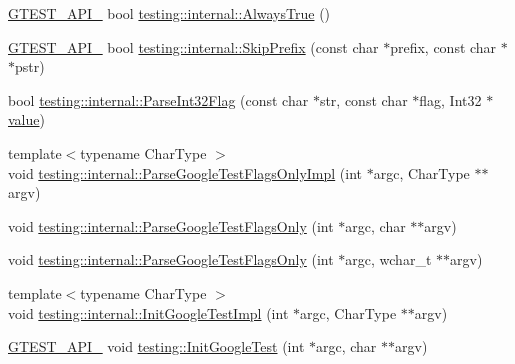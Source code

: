 \begin{DoxyCompactItemize}
\item 
\mbox{\hyperlink{_obj__test_2lib_2googletest-release-1_88_81_2googletest_2include_2gtest_2internal_2gtest-port_8h_aa73be6f0ba4a7456180a94904ce17790}{G\+T\+E\+S\+T\+\_\+\+A\+P\+I\+\_\+}} bool \mbox{\hyperlink{namespacetesting_1_1internal_a922c9da63cd4bf94fc473b9ecac76414}{testing\+::internal\+::\+Always\+True}} ()
\item 
\mbox{\hyperlink{_obj__test_2lib_2googletest-release-1_88_81_2googletest_2include_2gtest_2internal_2gtest-port_8h_aa73be6f0ba4a7456180a94904ce17790}{G\+T\+E\+S\+T\+\_\+\+A\+P\+I\+\_\+}} bool \mbox{\hyperlink{namespacetesting_1_1internal_a244d9a3765727306b597b8992ab84036}{testing\+::internal\+::\+Skip\+Prefix}} (const char $\ast$prefix, const char $\ast$$\ast$pstr)
\item 
bool \mbox{\hyperlink{namespacetesting_1_1internal_ae3449e173767750b613114ceac6d916a}{testing\+::internal\+::\+Parse\+Int32\+Flag}} (const char $\ast$str, const char $\ast$flag, Int32 $\ast$\mbox{\hyperlink{_obj__test_2lib_2googletest-master_2googlemock_2test_2gmock-matchers__test_8cc_a337b8a670efc0b086ad3af163f3121b6}{value}})
\item 
{\footnotesize template$<$typename Char\+Type $>$ }\\void \mbox{\hyperlink{namespacetesting_1_1internal_ae4c46ce8c3d016848fff52cc5133f2ac}{testing\+::internal\+::\+Parse\+Google\+Test\+Flags\+Only\+Impl}} (int $\ast$argc, Char\+Type $\ast$$\ast$argv)
\item 
void \mbox{\hyperlink{namespacetesting_1_1internal_a472880afbcc592a41e3d623e2dec8412}{testing\+::internal\+::\+Parse\+Google\+Test\+Flags\+Only}} (int $\ast$argc, char $\ast$$\ast$argv)
\item 
void \mbox{\hyperlink{namespacetesting_1_1internal_aa3c81a67914856448d0778990d9d9cab}{testing\+::internal\+::\+Parse\+Google\+Test\+Flags\+Only}} (int $\ast$argc, wchar\+\_\+t $\ast$$\ast$argv)
\item 
{\footnotesize template$<$typename Char\+Type $>$ }\\void \mbox{\hyperlink{namespacetesting_1_1internal_ac3c6fa93391768aa91c6238b31aaeeb5}{testing\+::internal\+::\+Init\+Google\+Test\+Impl}} (int $\ast$argc, Char\+Type $\ast$$\ast$argv)
\item 
\mbox{\hyperlink{_obj__test_2lib_2googletest-release-1_88_81_2googletest_2include_2gtest_2internal_2gtest-port_8h_aa73be6f0ba4a7456180a94904ce17790}{G\+T\+E\+S\+T\+\_\+\+A\+P\+I\+\_\+}} void \mbox{\hyperlink{namespacetesting_afd726ae08c9bd16dc52f78c822d9946b}{testing\+::\+Init\+Google\+Test}} (int $\ast$argc, char $\ast$$\ast$argv)

\end{DoxyCompactItemize}
